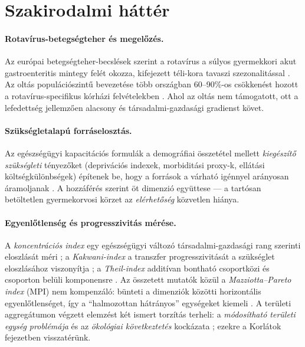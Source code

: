 \documentclass[11pt,a4paper]{article}
\begin{document}
\section{Szakirodalmi háttér}

\paragraph{Rotavírus-betegségteher és megelőzés.}
Az európai betegségteher-becslések szerint a rotavírus a súlyos gyermekkori
akut gastroenteritis mintegy felét okozza, kifejezett téli-kora tavaszi
szezonalitással \citep{soriano2006,ecdc_rota}. Az oltás populációszintű
bevezetése több országban 60--90\%-os csökkenést hozott a
rotavírus-specifikus kórházi felvételekben \citep{who2021rota}. Ahol az oltás
nem támogatott, ott a lefedettség jellemzően alacsony és társadalmi-gazdasági
gradienst követ.

\paragraph{Szükségletalapú forráselosztás.}
Az egészségügyi kapacitációs formulák a demográfiai összetétel mellett
\emph{kiegészítő szükségleti} tényezőket (deprivációs indexek, morbiditási
proxy-k, ellátási költségkülönbségek) építenek be, hogy a források a várható
igénnyel arányosan áramoljanak \citep{rice2001}. A hozzáférés
\citet{penchansky1981} szerint öt dimenzió együttese --- a tartósan
betöltetlen gyermekorvosi körzet az \emph{elérhetőség} közvetlen hiánya.

\paragraph{Egyenlőtlenség és progresszivitás mérése.}
A \emph{koncentrációs index} egy egészségügyi változó társadalmi-gazdasági
rang szerinti eloszlását méri \citep{wagstaff1991,odonnell2008}; a
\emph{Kakwani-index} a transzfer progresszivitását a szükséglet eloszlásához
viszonyítja \citep{kakwani1977}; a \emph{Theil-index} additívan bontható
csoportközi és csoporton belüli komponensre \citep{theil1967}. Az összetett
mutatók közül a \emph{Mazziotta--Pareto index} (MPI) nem kompenzáló: bünteti
a dimenziók közötti horizontális egyenlőtlenséget, így a
\enquote{halmozottan hátrányos} egységeket kiemeli
\citep{mazziotta2013,mazziotta2016}. A területi aggregátumon végzett
elemzést két ismert torzítás terheli: a \emph{módosítható területi egység
problémája} \citep{openshaw1984} és az \emph{ökológiai következtetés}
kockázata \citep{robinson1950}; ezekre a Korlátok fejezetben visszatérünk.
\end{document}
